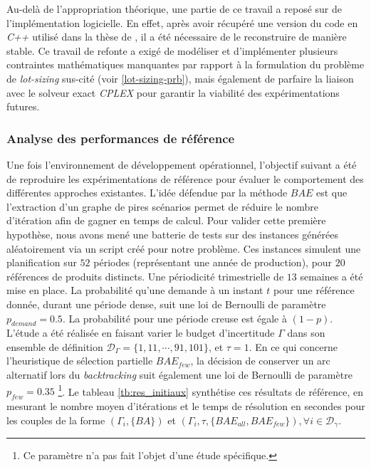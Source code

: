 \documentclass[12pt, a4paper, twoside]{report}
\numberwithin{equation}{section}
\begin{document}
\begin{Figure}[H]
	Au-delà de l'appropriation théorique, une partie de ce travail a reposé sur de l'implémentation logicielle. En effet, après avoir récupéré une version du code en \textit{C++} utilisé dans la thèse de \cite{portoleauTHESIS}, il a été nécessaire de le reconstruire de manière stable. Ce travail de refonte a exigé de modéliser et d'implémenter plusieurs contraintes mathématiques manquantes par rapport à la formulation du problème de \textit{lot-sizing} sus-cité (voir \ref{lot-sizing-prb}), mais également de parfaire la liaison avec le solveur exact \textit{CPLEX} pour garantir la viabilité des expérimentations futures.
	
	
	\subsubsection{Analyse des performances de référence}
	
	Une fois l'environnement de développement opérationnel, l'objectif suivant a été de reproduire les expérimentations de référence pour évaluer le comportement des différentes approches existantes. L'idée défendue par la méthode $BAE$ est que l'extraction d'un graphe de pires scénarios permet de réduire le nombre d'itération afin de gagner en temps de calcul. Pour valider cette première hypothèse, nous avons mené une batterie de tests sur des instances générées aléatoirement via un script créé pour notre problème. Ces instances simulent une planification sur $52$ périodes (représentant une année de production), pour $20$ références de produits distincts. Une périodicité trimestrielle de $13$ semaines a été mise en place. La probabilité qu'une demande à un instant $t$ pour une référence donnée, durant une période dense, suit une loi de Bernoulli de paramètre $p_{demand}=0.5$. La probabilité pour une période creuse est égale à $(1-p)$. L'étude a été réalisée en faisant varier le budget d'incertitude $\Gamma$ dans son ensemble de définition $\mathcal{D}_{\Gamma}=\{1, 11, \cdots, 91, 101\}$, et $\tau=1$. En ce qui concerne l'heuristique de sélection partielle $BAE_{few}$, la décision de conserver un arc alternatif lors du \textit{backtracking} suit également une loi de Bernoulli de paramètre $p_{few}=0.35$ \footnote{Ce paramètre n'a pas fait l'objet d'une étude spécifique.}. Le tableau \ref{tb:res_initiaux} synthétise ces résultats de référence, en mesurant le nombre moyen d'itérations et le temps de résolution en secondes pour les couples de la forme $(\Gamma_i, \{BA\})$ et $(\Gamma_i, \tau, \{BAE_{all}, BAE_{few}\}), \forall i\in\mathcal{D}_{\gamma}$.
	

\end{Figure}
\end{document}
